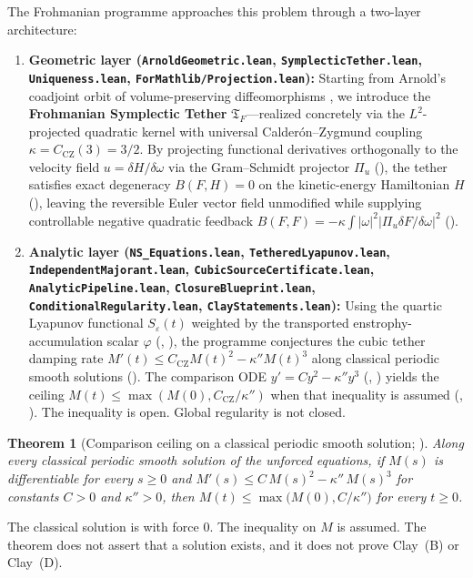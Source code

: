 \documentclass[11pt,a4paper]{article}
\theoremstyle{plain}
\newtheorem{theorem}{Theorem}[section]
\theoremstyle{definition}
\theoremstyle{remark}
\newcommand{\Tf}{\mathfrak{T}_F}
\newcommand{\CZ}{C_{\mathrm{CZ}}}
\begin{document}
The Frohmanian programme approaches this problem through a two-layer architecture:
\begin{enumerate}
\item \textbf{Geometric layer (\texttt{ArnoldGeometric.lean}, \texttt{SymplecticTether.lean}, \texttt{Uniqueness.lean}, \texttt{ForMathlib/Projection.lean}):} Starting from Arnold's coadjoint orbit of volume-preserving diffeomorphisms \cite{Arnold1966,ArnoldKhesin1998}, we introduce the \textbf{Frohmanian Symplectic Tether} $\Tf$—realized concretely via the $L^2$-projected quadratic kernel  with universal Calderón--Zygmund coupling $\kappa=\CZ(3)=3/2$. By projecting functional derivatives orthogonally to the velocity field $u=\delta H/\delta\omega$ via the Gram--Schmidt projector $\Pi_u$ (), the tether satisfies exact degeneracy $B(F,H)=0$ on the kinetic-energy Hamiltonian $H$ (), leaving the reversible Euler vector field unmodified while supplying controllable negative quadratic feedback $B(F,F)=-\kappa\int|\omega|^2|\Pi_u\delta F/\delta\omega|^2$ ().
\item \textbf{Analytic layer (\texttt{NS\_Equations.lean}, \texttt{TetheredLyapunov.lean}, \texttt{IndependentMajorant.lean}, \texttt{CubicSourceCertificate.lean}, \texttt{AnalyticPipeline.lean}, \texttt{ClosureBlueprint.lean}, \texttt{ConditionalRegularity.lean}, \texttt{ClayStatements.lean}):} Using the quartic Lyapunov functional $S_\varepsilon(t)$ weighted by the transported enstrophy-accumulation scalar $\varphi$ (, ), the programme conjectures the cubic tether damping rate $M'(t)\le \CZ M(t)^2-\kappa'' M(t)^3$ along classical periodic smooth solutions (). The comparison ODE $y'=Cy^2-\kappa''y^3$ (, ) yields the ceiling $M(t)\le\max(M(0),\CZ/\kappa'')$ when that inequality is assumed (, ). The inequality is open. Global regularity is not closed.
\end{enumerate}

\begin{theorem}[Comparison ceiling on a classical periodic smooth solution; ]\label{thm:main}
Along every classical periodic smooth solution of the unforced equations, if $M(s)$ is differentiable for every $s\ge0$ and $M'(s)\le C\,M(s)^2-\kappa''\,M(s)^3$ for constants $C>0$ and $\kappa''>0$, then $M(t)\le\max\bigl(M(0),C/\kappa''\bigr)$ for every $t\ge0$.
\end{theorem}
The classical solution is  with force $0$. The inequality on $M$ is assumed. The theorem does not assert that a solution exists, and it does not prove Clay~(B) or Clay~(D).
\end{document}
